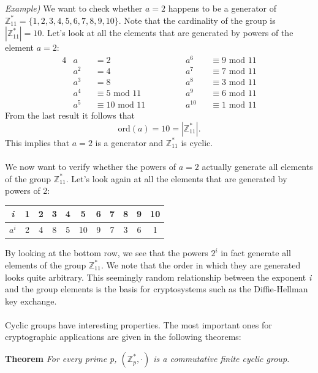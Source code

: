 \documentclass[11pt, a4paper]{article}
\newcommand{\mymod}{
    \text{ mod }
}
\begin{document}
\newpage
\hfill\break
\textit{Example)} We want to check whether $a=2$ happens to be a generator of $\mathbb{Z}_{11}^*=\{1,2,3,4,5,6,7,8,9,10\}$. Note that the cardinality of the group is $|\mathbb{Z}_{11}^*|=10$. Let's look at all the elements that are generated by powers of the element $a=2$:
\begin{alignat*}{4}
    &a &&=2\hspace{3cm}&&a^6&&\equiv9\mymod11\\
    &a^2 &&=4 &&a^7&&\equiv7\mymod11\\
    &a^3 &&=8 &&a^8&&\equiv3\mymod11\\
    &a^4 &&\equiv5\mymod11 &&a^9&&\equiv6\mymod11\\
    &a^5 &&\equiv10\mymod11 &&a^{10}&&\equiv1\mymod11
\end{alignat*}
From the last result it follows that
$$\text{ord}(a)=10=|\mathbb{Z}_{11}^*|.$$
This implies that $a=2$ is a generator and $\mathbb{Z}_{11}^*$ is cyclic.\\\\
We now want to verify whether the powers of $a=2$ actually generate all elements of the group $\mathbb{Z}_{11}^*$. Let's look again at all the elements that are generated by powers of 2:
\begin{center}
    \begin{tabular}{c|cccccccccc}
        \textit{i}&1&2&3&4&5&6&7&8&9&10\\
        \hline
        $a^i$&2&4&8&5&10&9&7&3&6&1 
    \end{tabular}
\end{center}
By looking at the bottom row, we see that the powers $2^i$ in fact generate all elements of the group $\mathbb{Z}_{11}^*$. We note that the order in which they are generated looks quite arbitrary. This seemingly random relationship between the exponent \textit{i} and the group elements is the basis for cryptosystems such as the Diffie-Hellman key exchange.\\\\
Cyclic groups have interesting properties. The most important ones for cryptographic applications are given in the following theorems:
\begin{center}
    \begin{framed}
        \textbf{Theorem} \textit{For every prime p, $(\mathbb{Z}_p^*,\cdot)$ is a commutative finite cyclic group.}
    \end{framed}
\end{center}
\end{document}

